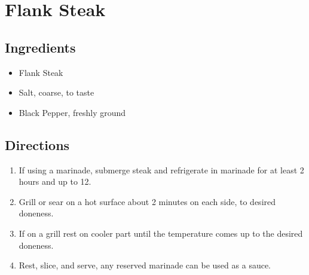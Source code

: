\section{Flank Steak}

\subsection{ Ingredients }

\begin{itemize}
  \item <2 lb> Flank Steak
  \item <2 tsp> Salt, coarse, to taste
  \item <2 tsp> Black Pepper, freshly ground
\end{itemize}

\subsection{ Directions }

\begin{enumerate}
  \item If using a marinade, submerge steak and refrigerate in marinade for at least 2 hours and up to 12. 
  \item Grill or sear on a hot surface about 2 minutes on each side, to desired doneness. 
  \item If on a grill rest on cooler part until the temperature comes up to the desired doneness. 
  \item Rest, slice, and serve, any reserved marinade can be used as a sauce. 
\end{enumerate}
